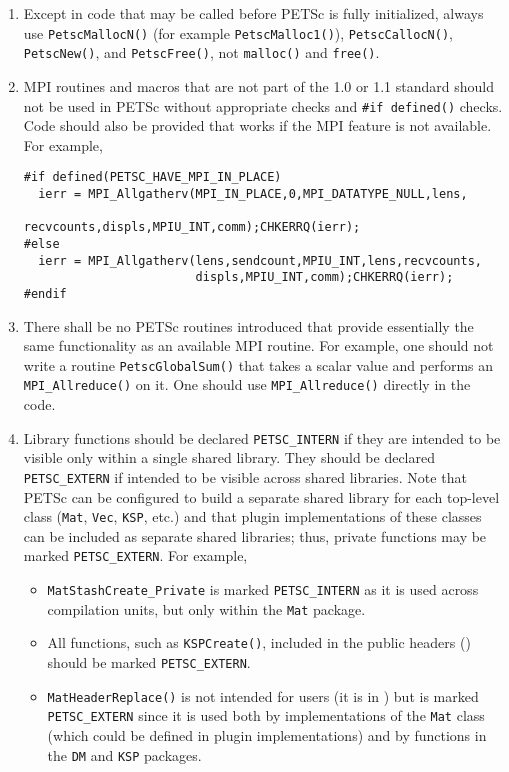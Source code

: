 \begin{enumerate}
\item Except in code that may be called before PETSc is fully initialized, always use \lstinline{PetscMallocN()} (for example \lstinline{PetscMalloc1()}), \lstinline{PetscCallocN()}, \lstinline{PetscNew()}, and \lstinline{PetscFree()}, not \lstinline{malloc()} and \lstinline{free()}.
\item MPI routines and macros that are not part of the 1.0 or 1.1 standard should not be used in PETSc without appropriate  checks and \lstinline{#if defined()} checks. 
 Code should also be provided that works if the MPI feature is not available. For example, 
\begin{lstlisting}
#if defined(PETSC_HAVE_MPI_IN_PLACE)
  ierr = MPI_Allgatherv(MPI_IN_PLACE,0,MPI_DATATYPE_NULL,lens,
                        recvcounts,displs,MPIU_INT,comm);CHKERRQ(ierr);
#else
  ierr = MPI_Allgatherv(lens,sendcount,MPIU_INT,lens,recvcounts,
                        displs,MPIU_INT,comm);CHKERRQ(ierr);
#endif
\end{lstlisting}
\item There shall be no PETSc routines introduced that provide essentially the same functionality as an available MPI routine. 
  For example, one should not write a routine \lstinline{PetscGlobalSum()} that takes a scalar value and performs an \lstinline{MPI_Allreduce()} on it. 
  One should use \lstinline{MPI_Allreduce()} directly in the code.
\item \label{styleitem:petscextern} Library functions should be declared \lstinline{PETSC_INTERN} if they are intended to be visible only within a single shared library. 
They should be declared \lstinline{PETSC_EXTERN} if intended to be visible across shared libraries. 
Note that PETSc can be configured to build a separate shared library for each top-level class (\lstinline{Mat}, \lstinline{Vec}, \lstinline{KSP}, etc.) and that plugin implementations of these classes can be included as separate shared libraries; thus, private functions may be marked \lstinline{PETSC_EXTERN}.
For example, 
\begin{itemize}
\item \lstinline{MatStashCreate_Private} is marked \lstinline{PETSC_INTERN} as it is used across compilation units, but only within the \lstinline{Mat} package.
\item All functions, such as \lstinline{KSPCreate()}, included in the public headers () should be marked \lstinline{PETSC_EXTERN}.
\item \lstinline{MatHeaderReplace()} is not intended for users (it is in ) but is marked \lstinline{PETSC_EXTERN} since it is used both by implementations of the \lstinline{Mat} class (which could be defined in plugin implementations) and by functions in the \lstinline{DM} and \lstinline{KSP} packages.
\end{itemize}
\end{enumerate}

